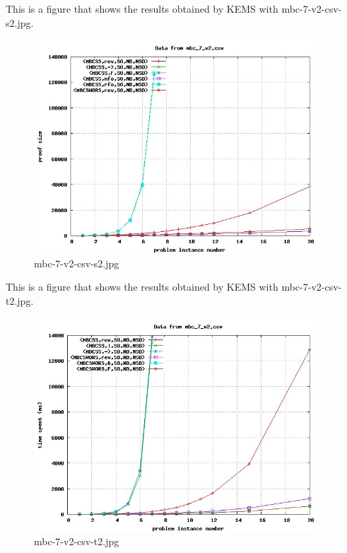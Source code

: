This is a figure that shows the results obtained by KEMS with mbc-7-v2-csv-s2.jpg.
\begin{figure}[htbp]
\begin{center}
\includegraphics[width=0.95\textwidth]{figuras/mbc-7-v2-csv-s2.jpg}
\end{center}
\caption{mbc-7-v2-csv-s2.jpg}
\end{figure}

This is a figure that shows the results obtained by KEMS with mbc-7-v2-csv-t2.jpg.
\begin{figure}[htbp]
\begin{center}
\includegraphics[width=0.95\textwidth]{figuras/mbc-7-v2-csv-t2.jpg}
\end{center}
\caption{mbc-7-v2-csv-t2.jpg}
\end{figure}

